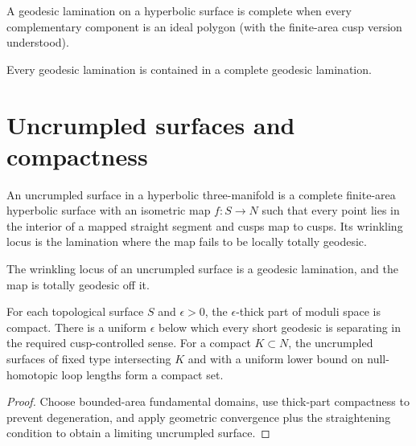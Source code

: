\begin{definition}
\label{thurston-ch08-complete-lamination}
A geodesic lamination on a hyperbolic surface is complete when every complementary component is an ideal polygon (with the finite-area cusp version understood).
\end{definition}

\begin{proposition}
\label{thurston-ch08-geodesic-lamination-completion}
Every geodesic lamination is contained in a complete geodesic lamination.
\end{proposition}

\section{Uncrumpled surfaces and compactness}

\begin{definition}
\label{thurston-ch08-uncrumpled-surface}
An uncrumpled surface in a hyperbolic three-manifold is a complete finite-area hyperbolic surface with an isometric map $f:S\to N$ such that every point lies in the interior of a mapped straight segment and cusps map to cusps.  Its wrinkling locus is the lamination where the map fails to be locally totally geodesic.
\end{definition}

\begin{proposition}
\label{thurston-ch08-wrinkling-lamination}
The wrinkling locus of an uncrumpled surface is a geodesic lamination, and the map is totally geodesic off it.
\end{proposition}

\begin{proposition}
\label{thurston-ch08-uncrumpled-compactness}
For each topological surface $S$ and $\epsilon>0$, the $\epsilon$-thick part of moduli space is compact.  There is a uniform $\epsilon$ below which every short geodesic is separating in the required cusp-controlled sense.  For a compact $K\subset N$, the uncrumpled surfaces of fixed type intersecting $K$ and with a uniform lower bound on null-homotopic loop lengths form a compact set.
\end{proposition}
\begin{proof}\sketch Choose bounded-area fundamental domains, use thick-part compactness to prevent degeneration, and apply geometric convergence plus the straightening condition to obtain a limiting uncrumpled surface.\end{proof}

